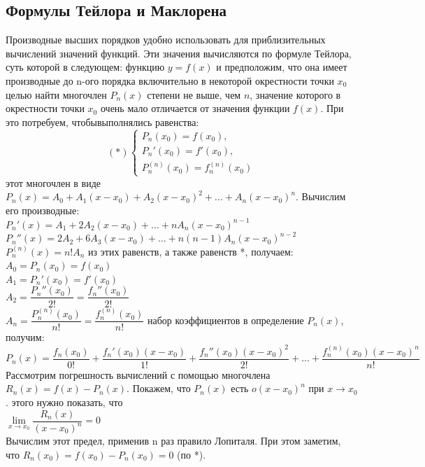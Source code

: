 \documentclass[oneside]{book}
\begin{document}
\begin{enumerate}
\begin{itemize}
\begin{enumerate}
\chapter{Формулы Тейлора и Маклорена}
Производные высших порядков удобно использовать для приблизительных вычислений значений функций. Эти значения вычисляются по формуле Тейлора, суть которой в следующем: 
 функцию $y=f(x)$ и предположим, что она имеет производные до n-ого порядка включительно в некоторой окрестности точки $x_0$
 целью найти многочлен $P_n(x)$ степени не выше, чем $n$, значение которого в окрестности точки $x_0$ очень мало отличается от значения функции $f(x)$. При это потребуем, чтобывыполнялись равенства:
\begin{equation}
(*)
	\begin{cases}
	P_n(x_0)=f(x_0),\\
	P_n'(x_0)=f'(x_0),\\
	P_n^{(n)}(x_0)=f_n^{(n)}(x_0)
	\end{cases}
\end{equation}
 этот многочлен в виде $P_n(x)=A_0+A_1(x-x_0)+A_2(x-x_0)^2+...+A_n(x-x_0)^n$. Вычислим его производные:\\
$P_n'(x)=A_1+2A_2(x-x_0)+...+nA_n(x-x_0)^{n-1}$\\
$P_n''(x)=2A_2+6A_3(x-x_0)+...+n(n-1)A_n(x-x_0)^{n-2}$\\
$P_n^{(n)}(x)=n!A_n$
 из этих равенств, а также равенств *, получаем:\\
$A_0=P_n(x_0)=f(x_0)$\\
$A_1=P_n'(x_0)=f'(x_0)$\\
$A_2=\dfrac{P_n''(x_0)}{2!}=\dfrac{f_n''(x_0)}{2!}$
\\$A_n=\dfrac{P_n^{(n)}(x_0)}{n!}=\dfrac{f_n^{(n)}(x_0)}{n!}$
 набор коэффициентов в определение $P_n(x)$, получим:
\\$P_n(x)=\dfrac{f_n(x_0)}{0!}+\dfrac{f_n'(x_0)(x-x_0)}{1!}+\dfrac{f_n''(x_0)(x-x_0)^2}{2!}+...+\dfrac{f_n^{(n)}(x_0)(x-x_0)^n}{n!}$\\
Рассмотрим погрешность вычислений с помощью многочлена $R_n(x)=f(x)-P_n(x)$. Покажем, что $P_n(x)$ есть $o(x-x_0)^n$ при $x \rightarrow x_0$.
 этого нужно показать, что\\
$\lim \limits_{x \rightarrow x_0}\dfrac{R_n(x)}{(x-x_0)^n}=0$\\
Вычислим этот предел, применив n раз правило Лопиталя. При этом заметим, что $R_n(x_0)=f(x_0)-P_n(x_0)=0$ (по *).\\

\end{enumerate}
\end{itemize}
\end{enumerate}
\end{document}
